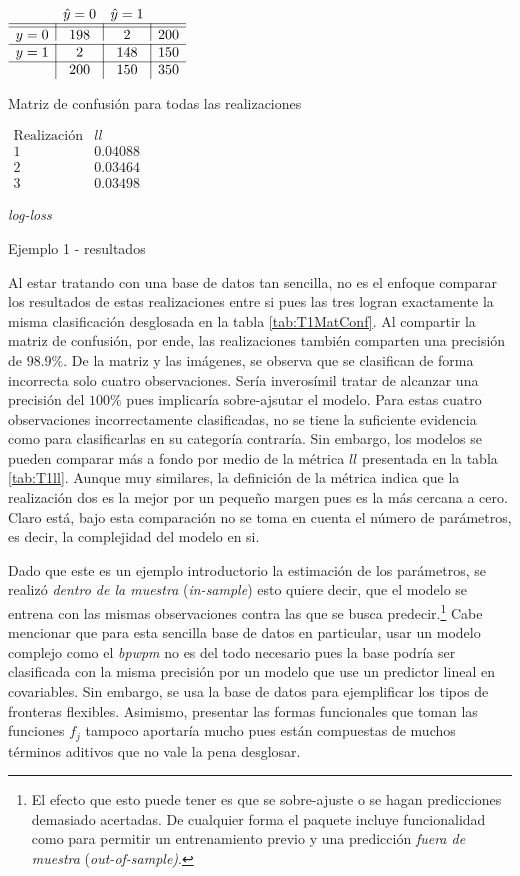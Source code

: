 \documentclass[../Main/Main.tex]{subfiles}
\begin{document}
\begin{table}[h]
\begin{subtable}[t]{0.45\textwidth}
	\centering
	$\begin{array}{l|c|c|l} ~ & \hat{y} = 0 & \hat{y} = 1 & ~ \\ \hline\hline y = 0 & 198 & 2 & 200 \\ \hline y = 1 & 2 & 148 & 150 \\ \hline ~ & 200 & 150 & 350 \end{array}$
	\caption{Matriz de confusión para todas las realizaciones}
	\label{tab:T1MatConf}
\end{subtable}
\hfill
\begin{subtable}[t]{0.45\textwidth}
	\centering
	$\begin{array}{c|c}
		\text{Realización} & ll \\ \hline\hline
		1 & 0.04088 \\
		2 & 0.03464 \\
		3 & 0.03498
	\end{array}$
	\caption{\textit{log-loss}}
	\label{tab:T1ll}
\end{subtable}
\caption{Ejemplo 1 - resultados}
\label{tab:T1Resultados}
\end{table}
Al estar tratando con una base de datos tan sencilla, no es el enfoque comparar los resultados de estas realizaciones entre si pues las tres logran exactamente la misma clasificación desglosada en la tabla \ref{tab:T1MatConf}. Al compartir la matriz de confusión, por ende, las realizaciones también comparten una precisión de $98.9\%$. De la matriz y las imágenes, se observa que se clasifican de forma incorrecta solo cuatro observaciones. Sería inverosímil tratar de alcanzar una precisión del $100\%$ pues implicaría sobre-ajsutar el modelo. Para estas cuatro observaciones incorrectamente clasificadas, no se tiene la suficiente evidencia como para clasificarlas en su categoría contraría. Sin embargo, los modelos se pueden comparar más a fondo por medio de la métrica $ll$ presentada en la tabla \ref{tab:T1ll}. Aunque muy similares, la definición de la métrica indica que la realización dos es la mejor por un pequeño margen pues es la más cercana a cero. Claro está, bajo esta comparación no se toma en cuenta el número de parámetros, es decir, la complejidad del modelo en si.

Dado que este es un ejemplo introductorio la estimación de los parámetros, se realizó \textit{dentro de la muestra} (\textit{in-sample}) esto quiere decir, que el modelo se entrena con las mismas observaciones contra las que se busca predecir.\footnote{El efecto que esto puede tener es que se sobre-ajuste o se hagan predicciones demasiado acertadas. De cualquier forma el paquete incluye funcionalidad como para permitir un entrenamiento previo y una predicción \textit{fuera de muestra} (\textit{out-of-sample)}.} Cabe mencionar que para esta sencilla base de datos en particular, usar un modelo complejo como el \textit{bpwpm} no es del todo necesario pues la base podría ser clasificada con la misma precisión por un modelo que use un predictor lineal en covariables. Sin embargo, se usa la base de datos para ejemplificar los tipos de fronteras flexibles. Asimismo, presentar las formas funcionales que toman las funciones $f_j$ tampoco aportaría mucho pues están compuestas de muchos términos aditivos que no vale la pena desglosar. 
\end{document}

